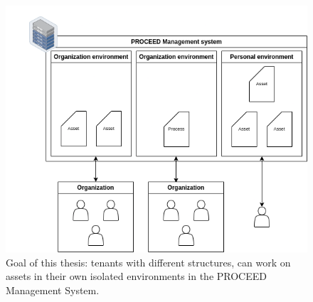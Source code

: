 \begin{figure}[h]
	\centering
	\includegraphics[scale=0.45]{images/proceed-workspaces-v2.drawio.png}
	\caption{Goal of this thesis: tenants with different structures, can work on assets in their own isolated environments in
		the PROCEED Management System.}
\end{figure}
\FloatBarrier


%
%

